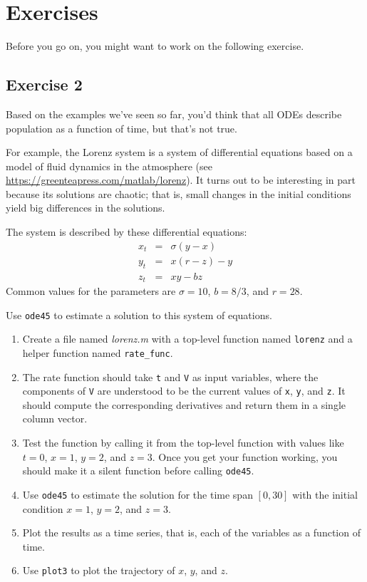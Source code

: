\section{Exercises}

Before you go on, you might want to work on the following exercise.

\subsection{Exercise 2}


Based on the examples we've seen so far, you'd think that all ODEs describe population as
a function of time, but that's not true.

For example, the Lorenz system is a system of differential equations based on a model of fluid dynamics in the atmosphere
(see \url{https://greenteapress.com/matlab/lorenz}).
It turns out to be interesting in part because its solutions are chaotic; that is, small changes in the initial conditions yield big differences in the solutions.

The system is described by these differential equations:
%
\begin{eqnarray*}
x_t &=& \sigma (y - x)  \\
y_t &=& x (r - z) - y   \\
z_t &=& xy - b z
\end{eqnarray*}
%
Common values for the parameters are $\sigma = 10$, $b = 8/3$, and $r=28$.

Use \lstinline{ode45} to estimate a solution to this system of equations.

\begin{enumerate}

\item Create a file named \emph{lorenz.m} with a top-level function named \lstinline{lorenz} and a helper function named \lstinline{rate_func}.

\item  The rate function should
take \lstinline{t} and \lstinline{V} as input variables, where the components
of \lstinline{V} are understood to be the current values of \lstinline{x},
\lstinline{y}, and \lstinline{z}.  It should compute the corresponding derivatives
and return them in a single column vector.

\item Test the function by calling it from the top-level function with values like $t=0$, $x=1$, $y=2$, and $z=3$.  
Once you get your function working, you should make it a silent function before calling \lstinline{ode45}.

\item Use \lstinline{ode45} to estimate the solution for the time span $[0, 30]$
with the initial condition $x=1$, $y=2$, and $z=3$.

\item Plot the results as a time series, that is, each of the variables as a function of time.

\item Use \lstinline{plot3} to plot the trajectory of $x$, $y$, and $z$.

\end{enumerate}



